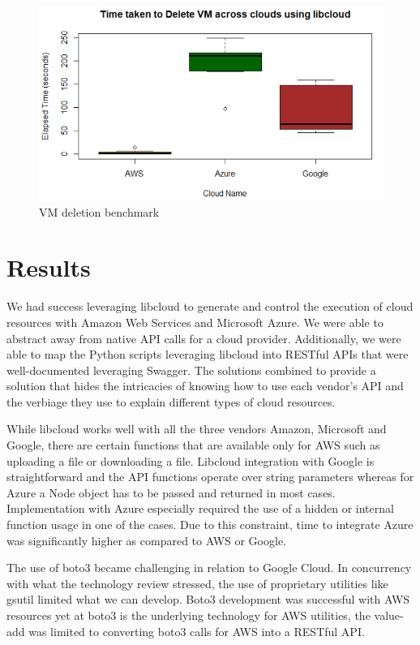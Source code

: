 \begin{figure}[!ht]
  \centering
  \includegraphics[width=\columnwidth]{images/DeleteVM.png}
  \caption{VM deletion benchmark}\label{F:vm-delete}
\end{figure}

\section{Results}
We had success leveraging libcloud to generate and control the execution of
cloud resources with Amazon Web Services and Microsoft Azure. We were able to
abstract away from native API calls for a cloud provider. Additionally, we were
able to map the Python scripts leveraging libcloud into RESTful APIs that were
well-documented leveraging Swagger. The solutions combined to provide a
solution that hides the intricacies of knowing how to use each vendor's API and
the verbiage they use to explain different types of cloud resources. 

While libcloud works well with all the three vendors Amazon, Microsoft and
Google,
there are certain functions that are available only for AWS such as uploading
a file or downloading a file. Libcloud integration with Google is
straightforward
and the API functions operate over string parameters whereas for Azure a Node
object has to be passed and returned in most cases. Implementation with Azure
especially required the use of a hidden or internal function usage in one of
the
cases. Due to this constraint, time to integrate Azure was significantly higher
as compared
to AWS or Google.

The use of boto3 became challenging in relation to Google Cloud. In concurrency
with what the technology review stressed, the
use of proprietary utilities like
gsutil limited what we can develop. Boto3 development was successful with AWS
resources yet at boto3 is the underlying technology for AWS utilities, the
value-add was limited to converting boto3 calls for AWS into a RESTful API.

